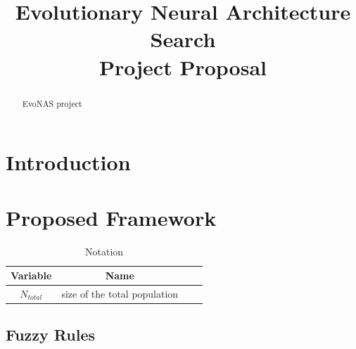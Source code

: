 \documentclass[conference]{IEEEtran}
\begin{document}
  
  \title{Evolutionary Neural Architecture Search \\ Project Proposal}
  
  \author{
  }
  
  \maketitle
  
  \begin{abstract}
  EvoNAS project
  \end{abstract}
  \IEEEpeerreviewmaketitle
  
  \section{Introduction}
  

  \section{Proposed Framework}
 
  \begin{table}[H]
    
    \centering
      \begin{tabular}{cccc}
      \toprule
      Variable&Name\\
      \midrule
     
      $N_{total}$&size of the total population\\
  \bottomrule
  \end{tabular}
  \caption{Notation}
  \label{table:1}
  \end{table}

  \subsection{Fuzzy Rules}
  
\end{document}
